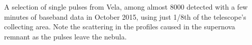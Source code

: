 A selection of single pulses from Vela, among almost 8000 detected with a few minutes of baseband data in October 2015, using just 1/8th of the telescope's collecting area. Note the scattering in the profiles caused in the supernova remnant as the pulses leave the nebula.